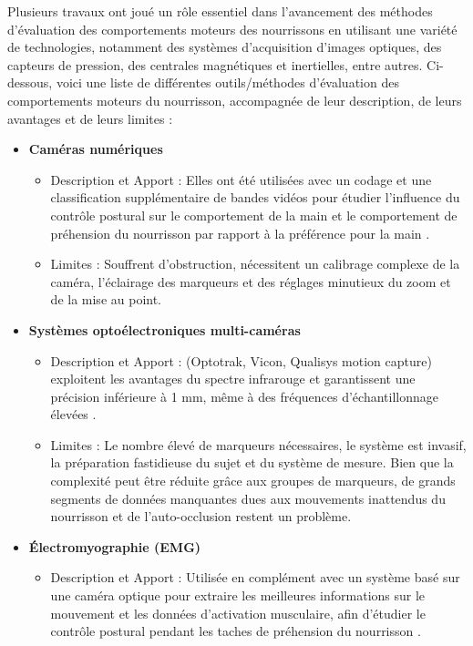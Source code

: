 \documentclass[8pt]{article}
\begin{document}
Plusieurs travaux ont joué un rôle essentiel dans l'avancement des méthodes d'évaluation des comportements moteurs des nourrissons en utilisant une variété de technologies, notamment des systèmes d'acquisition d'images optiques, des capteurs de pression, des centrales magnétiques et inertielles, entre autres. Ci-dessous, voici une liste de différentes outils/méthodes d'évaluation des comportements moteurs du nourrisson, accompagnée de leur description, de leurs avantages et de leurs limites :
\begin{itemize}
    \item \textbf{Caméras numériques}
    \begin{itemize}[label={\textbullet}, leftmargin=*]
        \item Description et Apport :  Elles ont  été utilisées avec un codage et une classification supplémentaire de bandes vidéos pour étudier l'influence du contrôle postural sur le comportement de la main\cite{rocha_influence_2008} et le comportement de préhension du nourrisson par rapport à la préférence pour la main \cite{marschik_reaching_2008}. 
        \item Limites :  Souffrent d'obstruction, nécessitent un calibrage complexe de la caméra, l'éclairage des marqueurs et des réglages minutieux du zoom et de la mise au point.
    \end{itemize}
    \item \textbf{Systèmes optoélectroniques multi-caméras}
    \begin{itemize}[label={\textbullet}, leftmargin=*]
        \item Description et Apport : (Optotrak, Vicon, Qualisys motion capture) exploitent les avantages du spectre infrarouge et garantissent une précision inférieure à 1 mm, même à des fréquences d'échantillonnage élevées \cite{petitto_baby_2004}.
        \item Limites :  Le nombre élevé de marqueurs nécessaires, le système est invasif, la préparation fastidieuse du sujet et du système de mesure. Bien que la complexité peut être réduite grâce aux groupes de marqueurs, de grands segments de données manquantes dues aux mouvements inattendus du nourrisson et de l'auto-occlusion restent un problème.
    \end{itemize}
    \item \textbf{Électromyographie (EMG)}
    \begin{itemize}[label={\textbullet}, leftmargin=*]
        \item Description et Apport : Utilisée en complément avec un système basé sur une caméra optique pour extraire les meilleures informations sur le mouvement et les données d'activation musculaire, afin d'étudier le contrôle postural pendant les taches de préhension du nourrisson \cite{van_der_fits_postural_1999,de_graaf-peters_postural_2007}.

\end{itemize}
\end{itemize}
\end{document}
